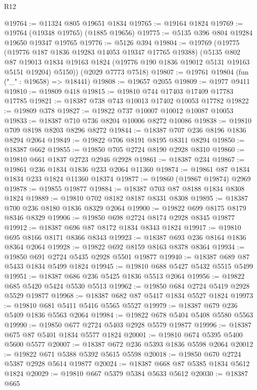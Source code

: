\begin{lexlean}{R12}
\begin{coremodule}
@19764 := @11324 @805 @19651 @1834
@19765 := @19164 @1824
@19769 := @19764 (@19348 @19765) (@1885 @19656)
@19775 := @5135 @396 @804 @19284 @19650 @19347 @19765
@19776 := @5126 @394
@19804 := @19769
    (@19775
      (@19776 @187 @1836 @19283 @14053 @19347 @17765 @19388)
      (@5135
        @802
        @87
        @19013
        @1834
        @19163
        @1824
        (@19776 @190 @1836 @19012 @5131 @19163 @5151 @19204)
        @5150))
    (@2029 @7773 @7518)
@19807 := @19761 @19804 (fun ("_" : @19658) => @18441)
@19808 := @19657 @2055
@19809 := @1977 @9411
@19810 := @19809 @418
@19815 := @19810 @744 @17403 @17409 @17783 @17785
@19821 := @18387 @738 @743 @10013 @17402 @10053 @17782
@19822 := @19809 @378
@19827 := @19822 @737 @10007 @10012 @10087 @10053
@19833 := @18387 @710 @736 @8204 @10006 @8272 @10086
@19838 := @19810 @709 @8198 @8203 @8296 @8272
@19844 := @18387 @707 @236 @8196 @1836 @8294 @2064
@19849 := @19822 @706 @8191 @8195 @8311 @8294
@19850 := @18387 @662
@19855 := @19850 @705 @2724 @8190 @2928 @8310
@19860 := @19810 @661 @1837 @2723 @2946 @2928
@19861 := @18387 @234
@19867 := @19861 @236 @1834 @1836 @233 @2064 @11360
@19874 := @19861 @87 @1834 @1834 @233 @1824 @11360 @18374
@19877 := @19860 (@19867 @19874) @2969
@19878 := @19855 @19877
@19884 := @18387 @703 @87 @8188 @1834 @8308 @1824
@19889 := @19810 @702 @8182 @8187 @8331 @8308
@19895 := @18387 @700 @236 @8180 @1836 @8329 @2064
@19900 := @19822 @699 @8175 @8179 @8346 @8329
@19906 := @19850 @698 @2724 @8174 @2928 @8345 @19877
@19912 := @18387 @696 @87 @8172 @1834 @8343 @1824
@19917 := @19810 @695 @8166 @8171 @8366 @8343
@19923 := @18387 @693 @236 @8164 @1836 @8364 @2064
@19928 := @19822 @692 @8159 @8163 @8378 @8364
@19934 := @19850 @691 @2724 @5435 @2928 @5501 @19877
@19940 := @18387 @689 @87 @5433 @1834 @5499 @1824
@19945 := @19810 @688 @5427 @5432 @5515 @5499
@19951 := @18387 @686 @236 @5425 @1836 @5513 @2064
@19956 := @19822 @685 @5420 @5424 @5530 @5513
@19962 := @19850 @684 @2724 @5419 @2928 @5529 @19877
@19968 := @18387 @682 @87 @5417 @1834 @5527 @1824
@19973 := @19810 @681 @5411 @5416 @5565 @5527
@19979 := @18387 @679 @236 @5409 @1836 @5563 @2064
@19984 := @19822 @678 @5404 @5408 @5580 @5563
@19990 := @19850 @677 @2724 @5403 @2928 @5579 @19877
@19996 := @18387 @675 @87 @5401 @1834 @5577 @1824
@20001 := @19810 @674 @5395 @5400 @5600 @5577
@20007 := @18387 @672 @236 @5393 @1836 @5598 @2064
@20012 := @19822 @671 @5388 @5392 @5615 @5598
@20018 := @19850 @670 @2724 @5387 @2928 @5614 @19877
@20024 := @18387 @668 @87 @5385 @1834 @5612 @1824
@20029 := @19810 @667 @5379 @5384 @5633 @5612
@20030 := @18387 @665

\end{coremodule}
\end{lexlean}
